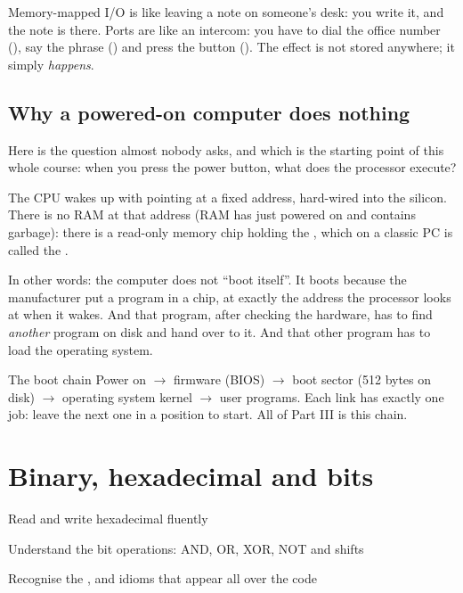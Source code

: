 \begin{analogy}
Memory-mapped I/O is like leaving a note on someone's desk: you write it, and the note is there.
Ports are like an intercom: you have to dial the office number (), say the phrase
() and press the button (). The effect is not stored anywhere; it simply
\emph{happens}.
\end{analogy}

\section{Why a powered-on computer does nothing}

Here is the question almost nobody asks, and which is the starting point of this whole course:
when you press the power button, what does the processor execute?

The CPU wakes up with  pointing at a fixed address, hard-wired into the silicon. There is
no RAM at that address (RAM has just powered on and contains garbage): there is a read-only memory
chip holding the , which on a classic PC is called the .

In other words: the computer does not ``boot itself''. It boots because the manufacturer put a
program in a chip, at exactly the address the processor looks at when it wakes. And that program,
after checking the hardware, has to find \emph{another} program on disk and hand over to it. And
that other program has to load the operating system.

\begin{concept}{The boot chain}
Power on $\rightarrow$ firmware (BIOS) $\rightarrow$ boot sector (512 bytes on disk)
$\rightarrow$ operating system kernel $\rightarrow$ user programs. Each link has exactly one job:
leave the next one in a position to start. All of Part III is this chain.
\end{concept}


\chapter{Binary, hexadecimal and bits}

\begin{goals}
  \item Read and write hexadecimal fluently
  \item Understand the bit operations: AND, OR, XOR, NOT and shifts
  \item Recognise the ,  and  idioms that appear all over the code
\end{goals}

